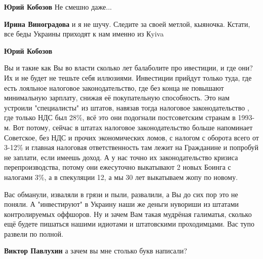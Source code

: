 \begin{itemize}
\begin{itemize}
\textbf{Юрий Кобозов} Не смешно даже...

 
\textbf{Ирина Виноградова} и я не шучу. Следите за своей метлой, кыяночка. Кстати, все беды Украины приходят к нам именно из Кyiva

 
\textbf{Юрий Кобозов} 

Вы и такие как Вы во власти сколько лет балаболите про ивестиции, и где они? Их
и не будет не тешьте себя иллюзиями. Инвестиции прийдут только туда, где есть
лояльное налоговое законодательство, где без конца не повышают минимальную
зарплату, снижая её покупательную способность. Это нам устроили "специалисты"
из штатов, навязав тогда налоговое законодательство , где только НДС был 28\%,
всё это они подогнали постсоветским странам в 1993-м. Вот потому, сейчас в
штатах налоговое законодательство больше напоминает Советское, без НДС и прочих
экономических ломов, с налогом с оборота всего от 3-12\% и главная налоговая
ответственность там лежит на Гражданине и попробуй не заплати, если имеешь
доход. А у нас точно их законодательство кризиса перепроизводства, потому они
ежесуточно выкатывают 2 новых Боинга с налогами 3\%, а в спекуляции 12, а мы 30
лет выкатываем жопу по новому.

Вас обманули, изваляли в грязи и пыли, развалили, а Вы до сих пор это не
поняли. А "инвестируют" в Украину наши же деньги нувориши из штатами
контролируемых оффшоров. Ну и зачем Вам такая мудрёная галиматья, сколько ещё
будете пишаться нашими идиотами и штатовскими проходимцами. Вас тупо развели по
полной.

 
\textbf{Виктор Павлухин} а зачем вы мне столько букв написали?


\end{itemize}
\end{itemize}
